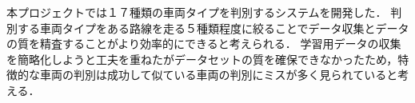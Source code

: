 
本プロジェクトでは１７種類の車両タイプを判別するシステムを開発した．
判別する車両タイプをある路線を走る５種類程度に絞ることでデータ収集とデータの質を精査することがより効率的にできると考えられる．
学習用データの収集を簡略化しようと工夫を重ねたがデータセットの質を確保できなかったため，特徴的な車両の判別は成功して似ている車両の判別にミスが多く見られていると考える．

